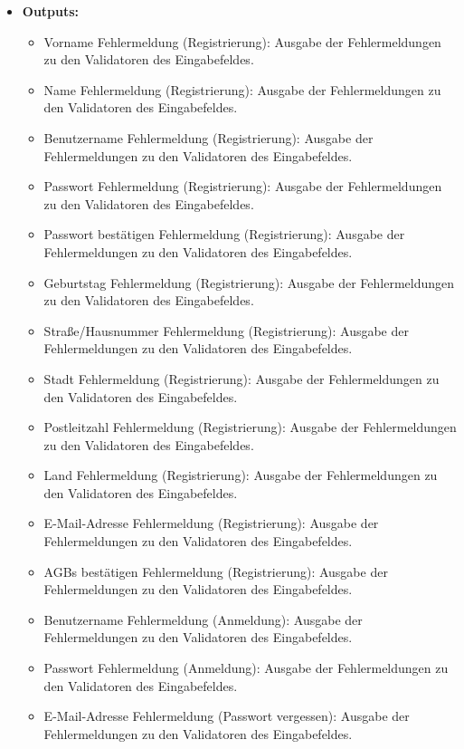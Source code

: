 \begin{itemize}
\begin{itemize}
				
			\end{itemize}
			\item \textbf{Outputs:} 
			\begin{itemize}
				\item Vorname Fehlermeldung (Registrierung): Ausgabe der Fehlermeldungen zu den Validatoren des Eingabefeldes.
				\item Name Fehlermeldung (Registrierung): Ausgabe der Fehlermeldungen zu den Validatoren des Eingabefeldes.
				\item Benutzername Fehlermeldung (Registrierung): Ausgabe der Fehlermeldungen zu den Validatoren des Eingabefeldes.
				\item Passwort Fehlermeldung (Registrierung): Ausgabe der Fehlermeldungen zu den Validatoren des Eingabefeldes.
				\item Passwort bestätigen Fehlermeldung (Registrierung): Ausgabe der Fehlermeldungen zu den Validatoren des Eingabefeldes.
				\item Geburtstag Fehlermeldung (Registrierung): Ausgabe der Fehlermeldungen zu den Validatoren des Eingabefeldes.
				\item Straße/Hausnummer Fehlermeldung (Registrierung): Ausgabe der Fehlermeldungen zu den Validatoren des Eingabefeldes.
				\item Stadt Fehlermeldung (Registrierung): Ausgabe der Fehlermeldungen zu den Validatoren des Eingabefeldes.
				\item Postleitzahl Fehlermeldung (Registrierung): Ausgabe der Fehlermeldungen zu den Validatoren des Eingabefeldes.
				\item Land Fehlermeldung (Registrierung): Ausgabe der Fehlermeldungen zu den Validatoren des Eingabefeldes.
				\item E-Mail-Adresse Fehlermeldung (Registrierung): Ausgabe der Fehlermeldungen zu den Validatoren des Eingabefeldes.
				\item AGBs bestätigen Fehlermeldung (Registrierung): Ausgabe der Fehlermeldungen zu den Validatoren des Eingabefeldes.
				\item Benutzername Fehlermeldung (Anmeldung): Ausgabe der Fehlermeldungen zu den Validatoren des Eingabefeldes.
				\item Passwort Fehlermeldung (Anmeldung): Ausgabe der Fehlermeldungen zu den Validatoren des Eingabefeldes.
				\item E-Mail-Adresse Fehlermeldung (Passwort vergessen): Ausgabe der Fehlermeldungen zu den Validatoren des Eingabefeldes.
			\end{itemize}
			

\end{itemize}
